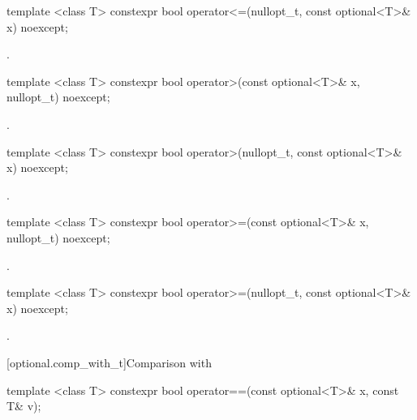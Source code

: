 %
\begin{itemdecl}
template <class T> constexpr bool operator<=(nullopt_t, const optional<T>& x) noexcept;
\end{itemdecl}

\begin{itemdescr}
\pnum
\returns
{}.
\end{itemdescr}

%
\begin{itemdecl}
template <class T> constexpr bool operator>(const optional<T>& x, nullopt_t) noexcept;
\end{itemdecl}

\begin{itemdescr}
\pnum
\returns
{}.
\end{itemdescr}

%
\begin{itemdecl}
template <class T> constexpr bool operator>(nullopt_t, const optional<T>& x) noexcept;
\end{itemdecl}

\begin{itemdescr}
\pnum
\returns
{}.
\end{itemdescr}

%
\begin{itemdecl}
template <class T> constexpr bool operator>=(const optional<T>& x, nullopt_t) noexcept;
\end{itemdecl}

\begin{itemdescr}
\pnum
\returns
{}.
\end{itemdescr}

%
\begin{itemdecl}
template <class T> constexpr bool operator>=(nullopt_t, const optional<T>& x) noexcept;
\end{itemdecl}

\begin{itemdescr}
\pnum
\returns
{}.
\end{itemdescr}

[optional.comp_with_t]{Comparison with }

%
\begin{itemdecl}
template <class T> constexpr bool operator==(const optional<T>& x, const T& v);
\end{itemdecl}

